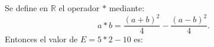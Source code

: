 Se define en $\mathbb{R}$ el operador $*$ mediante:
$$
a*b=\frac{(a+b)^2}{4}-\frac{(a-b)^2}{4}.
$$
Entonces el valor de $E=5*2-10$ es:
